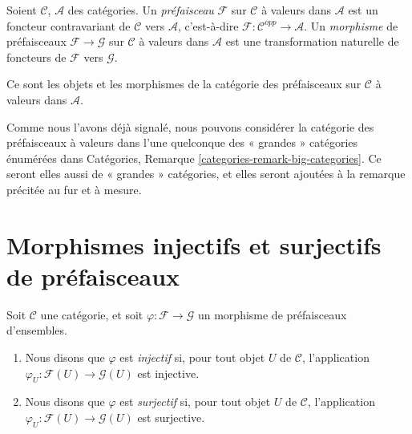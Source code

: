 \begin{definition}
\label{definition-presheaf}
Soient $\mathcal{C}$, $\mathcal{A}$ des catégories.
Un {\it préfaisceau} $\mathcal{F}$ sur $\mathcal{C}$
à valeurs dans $\mathcal{A}$ est un foncteur
contravariant de $\mathcal{C}$ vers $\mathcal{A}$,
c’est-à-dire $\mathcal{F} : \mathcal{C}^{opp} \to \mathcal{A}$.
Un {\it morphisme} de préfaisceaux $\mathcal{F} \to \mathcal{G}$
sur $\mathcal{C}$ à valeurs dans $\mathcal{A}$ est une transformation
naturelle de foncteurs de $\mathcal{F}$ vers $\mathcal{G}$.
\end{definition}

\noindent
Ce sont les objets et les morphismes de la catégorie des préfaisceaux
sur $\mathcal{C}$ à valeurs dans $\mathcal{A}$.

\begin{remark}
\label{remark-big-presheaves}
Comme nous l’avons déjà signalé, nous pouvons considérer la catégorie des
préfaisceaux à valeurs dans l’une quelconque des « grandes » catégories
énumérées dans Catégories, Remarque \ref{categories-remark-big-categories}.
Ce seront elles aussi de « grandes » catégories, et elles seront
ajoutées à la remarque précitée au fur et à mesure.
\end{remark}
















\section{Morphismes injectifs et surjectifs de préfaisceaux}
\label{section-injective-surjective}

\begin{definition}
\label{definition-presheaves-injective-surjective}
Soit $\mathcal{C}$ une catégorie, et soit $\varphi : \mathcal{F}
\to \mathcal{G}$ un morphisme de préfaisceaux d’ensembles.
\begin{enumerate}
\item Nous disons que $\varphi$ est {\it injectif} si, pour tout objet
$U$ de $\mathcal{C}$, l’application $\varphi_U : \mathcal{F}(U)
\to \mathcal{G}(U)$ est injective.
\item Nous disons que $\varphi$ est {\it surjectif} si, pour tout objet
$U$ de $\mathcal{C}$, l’application $\varphi_U : \mathcal{F}(U)
\to \mathcal{G}(U)$ est surjective.
\end{enumerate}
\end{definition}

